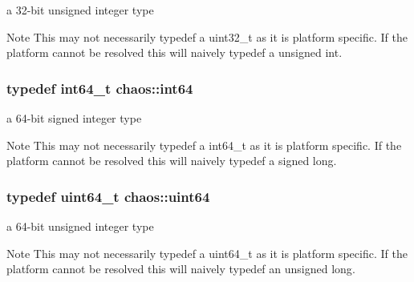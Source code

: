 a 32-\/bit unsigned integer type 

\begin{DoxyNote}{Note}
This may not necessarily {\ttfamily typedef} a {\ttfamily uint32\+\_\+t} as it is platform specific. If the platform cannot be resolved this will naively {\ttfamily typedef} a {\ttfamily unsigned int}. 
\end{DoxyNote}
\hypertarget{namespacechaos_a46c61f58d99879b936f58234b9a05e0c}{}
\subsubsection[{int64}]{\setlength{\rightskip}{0pt plus 5cm}typedef int64\+\_\+t {\bf chaos\+::int64}}\label{namespacechaos_a46c61f58d99879b936f58234b9a05e0c}


a 64-\/bit signed integer type 

\begin{DoxyNote}{Note}
This may not necessarily {\ttfamily typedef} a {\ttfamily int64\+\_\+t} as it is platform specific. If the platform cannot be resolved this will naively {\ttfamily typedef} a {\ttfamily signed long}. 
\end{DoxyNote}
\hypertarget{namespacechaos_a34fe5f5bfc3ef6d80b5d094ed91b4d6e}{}
\subsubsection[{uint64}]{\setlength{\rightskip}{0pt plus 5cm}typedef uint64\+\_\+t {\bf chaos\+::uint64}}\label{namespacechaos_a34fe5f5bfc3ef6d80b5d094ed91b4d6e}


a 64-\/bit unsigned integer type 

\begin{DoxyNote}{Note}
This may not necessarily {\ttfamily typedef} a {\ttfamily uint64\+\_\+t} as it is platform specific. If the platform cannot be resolved this will naively {\ttfamily typedef} an {\ttfamily unsigned long}. 
\end{DoxyNote}
